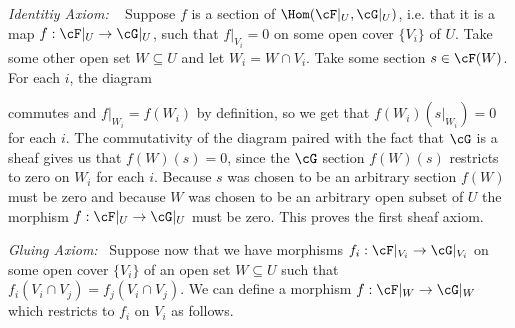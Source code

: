\begin{homework}[e]
\begin{prf}
		\emph{Identitiy Axiom:} ~ Suppose $f$ is a section of $\Hom(\cF|_U,\cG|_U)$, i.e. that it is a map $f:\cF|_U\to \cG|_U$, such that $f|_{V_i} = 0$ on some open cover $\{V_i\}$ of $U$. Take some other open set $W \subseteq U$ and let $W_i = W\cap V_i$. Take some section $s \in \cF(W)$. For each $i$, the diagram
		\begin{center}
		\end{center}
		commutes and $f|_{W_i} = f(W_i)$ by definition, so we get that $f(W_i)(s|_{W_i}) = 0$ for each $i$. The commutativity of the diagram paired with the fact that $\cG$ is a sheaf gives us that $f(W)(s) = 0$, since the $\cG$ section $f(W)(s)$ restricts to zero on $W_i$ for each $i$. Because $s$ was chosen to be an arbitrary section $f(W)$ must be zero and because $W$ was chosen to be an arbitrary open subset of $U$ the morphism $f:\cF|_U\to \cG|_U$ must be zero. This proves the first sheaf axiom.

		\bigskip

		\emph{Gluing Axiom:}~ Suppose now that we have morphisms $f_i:\cF|_{V_i}\to \cG|_{V_i}$ on some open cover $\{V_i\}$ of an open set $W\subseteq U$ such that $f_i(V_i\cap V_j) = f_j(V_i\cap V_j)$. We can define a morphism $f:\cF|_W\to \cG|_W$ which restricts to $f_i$ on $V_i$ as follows.


\end{prf}
\end{homework}

